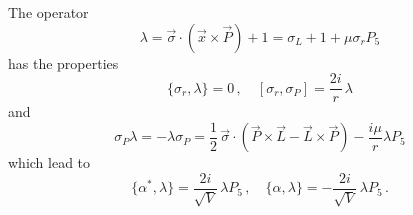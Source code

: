 \documentclass[a4paper,12pt]{article}
\begin{document}
The operator
\begin{equation}\label{Alam}
\lambda=\vec{\sigma}\cdot(\vec{x}\times \vec{P})+1
=\sigma_{L}+1+\mu\sigma_{r}P_{5}
\end{equation} 
has the properties
\begin{equation}
\{\sigma_{r},\lambda\}=0\,,\quad [\sigma_{r},\sigma_{P}]=
\frac{2i}{r}\,\lambda
\end{equation}
and
\begin{equation}\label{silam}
\sigma_{P}\lambda=-\lambda\sigma_{P}=
\frac{1}{2}\,\vec{\sigma}\cdot(\vec{P}\times\vec{L}-\vec{L}\times\vec{P})
-\frac{i\mu}{r}\lambda P_{5}
\end{equation}
which lead to 
\begin{equation}
\{\alpha^{*},\lambda\}=\frac{2i}{\sqrt{V}}\,\lambda P_{5}\,,\quad 
\{\alpha,\lambda\}=-\frac{2i}{\sqrt{V}}\,\lambda P_{5}\,. 
\end{equation}
\end{document}
